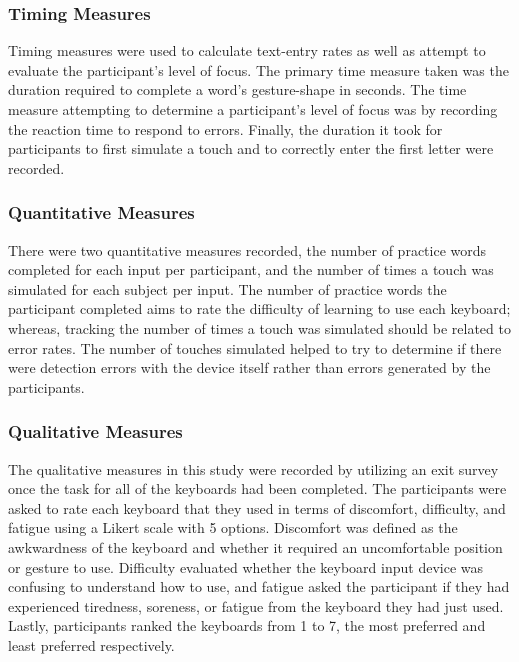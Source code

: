 \subsubsection{Timing Measures}
Timing measures were used to calculate text-entry rates as well as attempt to evaluate the participant's level of focus. The primary time measure taken was the duration required to complete a word's gesture-shape in seconds. The time measure attempting to determine a participant's level of focus was by recording the reaction time to respond to errors. Finally, the duration it took for participants to first simulate a touch and to correctly enter the first letter were recorded.

\subsubsection{Quantitative Measures}
There were two quantitative measures recorded, the number of practice words completed for each input per participant, and the number of times a touch was simulated for each subject per input. The number of practice words the participant completed aims to rate the difficulty of learning to use each keyboard; whereas, tracking the number of times a touch was simulated should be related to error rates. The number of touches simulated helped to try to determine if there were detection errors with the device itself rather than errors generated by the participants.

\subsubsection{Qualitative Measures}
The qualitative measures in this study were recorded by utilizing an exit survey once the task for all of the keyboards had been completed. The participants were asked to rate each keyboard that they used in terms of discomfort, difficulty, and fatigue using a Likert scale with 5 options. Discomfort was defined as the awkwardness of the keyboard and whether it required an uncomfortable position or gesture to use. Difficulty evaluated whether the keyboard input device was confusing to understand how to use, and fatigue asked the participant if they had experienced tiredness, soreness, or fatigue from the keyboard they had just used. Lastly, participants ranked the keyboards from 1 to 7, the most preferred and least preferred respectively.
